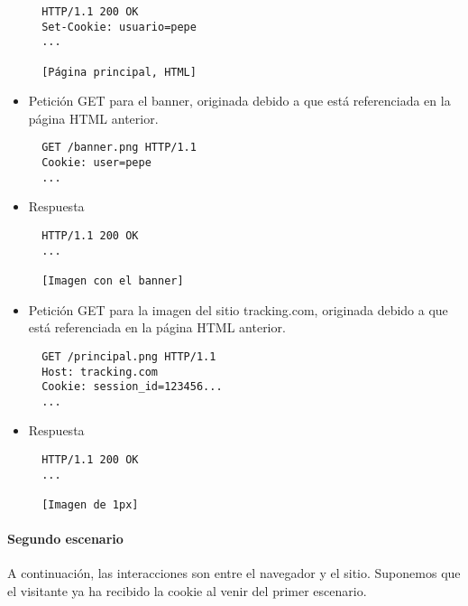 \begin{itemize}
\begin{verbatim}
  HTTP/1.1 200 OK
  Set-Cookie: usuario=pepe
  ...

  [Página principal, HTML]
\end{verbatim}

\item Petición GET para el banner, originada debido a que está referenciada en la página HTML anterior.

\begin{verbatim}
  GET /banner.png HTTP/1.1
  Cookie: user=pepe
  ...
\end{verbatim}

\item Respuesta

\begin{verbatim}
  HTTP/1.1 200 OK
  ...

  [Imagen con el banner]
\end{verbatim}

\item Petición GET para la imagen del sitio tracking.com, originada debido a que está referenciada en la página HTML anterior.

\begin{verbatim}
  GET /principal.png HTTP/1.1
  Host: tracking.com
  Cookie: session_id=123456...
  ...
\end{verbatim}

\item Respuesta

\begin{verbatim}
  HTTP/1.1 200 OK
  ...

  [Imagen de 1px]
\end{verbatim}

\end{itemize}


\paragraph{Segundo escenario}

A continuación, las interacciones son entre el navegador y el sitio. Suponemos que el visitante ya ha recibido la cookie al venir del primer escenario.

